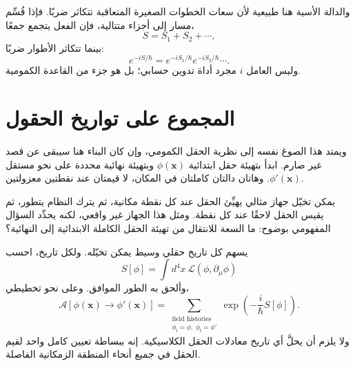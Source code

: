 والدالة الأسية هنا طبيعية لأن سعات الخطوات الصغيرة المتعاقبة تتكاثر ضربًا. فإذا قُسِّم مسار إلى أجزاء متتالية، فإن الفعل يتجمع جمعًا،
\begin{equation}
S=S_1+S_2+\cdots,
\end{equation}
بينما تتكاثر الأطوار ضربًا:
\begin{equation}
e^{-iS/\hbar}
=e^{-iS_1/\hbar}e^{-iS_2/\hbar}\cdots.
\end{equation}
وليس العامل \(i\) مجرد أداة تدوين حسابي؛ بل هو جزء من القاعدة الكمومية.

\begin{classroomqa}
\end{classroomqa}

\begin{classroomqa}
\end{classroomqa}

\section{المجموع على تواريخ الحقول}

ويمتد هذا الصوغ نفسه إلى نظرية الحقل الكمومي، وإن كان البناء هنا سيبقى عن قصد غير صارم. ابدأ بتهيئة حقل ابتدائية \(\phi(\mathbf{x})\) وبتهيئة نهائية محددة على نحو مستقل \(\phi'(\mathbf{x})\). وهاتان دالتان كاملتان في المكان، لا قيمتان عند نقطتين معزولتين.

يمكن تخيّل جهاز مثالي يهيِّئ الحقل عند كل نقطة مكانية، ثم يترك النظام يتطور، ثم يقيس الحقل لاحقًا عند كل نقطة. ومثل هذا الجهاز غير واقعي، لكنه يحدِّد السؤال المفهومي بوضوح: ما السعة للانتقال من تهيئة الحقل الكاملة الابتدائية إلى النهائية؟

يسهم كل تاريخ حقلي وسيط يمكن تخيّله. ولكل تاريخ، احسب
\begin{equation}
S[\phi]=\int d^4x\,\mathcal{L}(\phi,\partial_\mu\phi)
\end{equation}
وألحق به الطور الموافق. وعلى نحو تخطيطي،
\begin{equation}
\mathcal{A}\!\left[\phi(\mathbf{x})\rightarrow\phi'(\mathbf{x})\right]
=
\sum_{\substack{\text{field histories}\\
\phi_{\mathrm{i}}=\phi,\;\phi_{\mathrm{f}}=\phi'}}
\exp\!\left(-\frac{i}{\hbar}S[\phi]\right).
\end{equation}
ولا يلزم أن يحلَّ أي تاريخ معادلات الحقل الكلاسيكية. إنه ببساطة تعيين كامل واحد لقيم الحقل في جميع أنحاء المنطقة الزمكانية الفاصلة.

